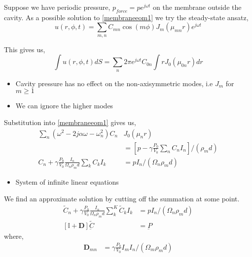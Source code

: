 \documentclass{beamer}
\begin{document}
\begin{frame}
 Suppose we have periodic pressure, $p_{force}=pe^{j\omega t}$ on the membrane outside the cavity.
 As a possible solution to \eqref{membraneeom1} we try the steady-state ansatz,
\begin{equation}\label{membranegeneral1}
 u(r,\phi,t)=\sum_{m,n}C_{mn}\cos(m\phi)J_m(\mu_{mn}r)e^{j\omega t}
\end{equation}
\end{frame}

\begin{frame}
This gives us,
\begin{equation}
 \int u(r,\phi,t)dS=\sum_n 2\pi e^{j\omega t} C_{0n}\int rJ_0(\mu_{0n}r)dr
\end{equation}

 \begin{itemize}
  \item Cavity pressure has no effect on the non-axisymmetric modes, i.e $J_m$ for $m\geq 1$
  \item We can ignore the higher modes
 \end{itemize}

\end{frame}

\begin{frame}
 Substitution into \eqref{membraneeom1} gives us,
 \begin{align}
  \sum_{n}(\omega^2-2j\alpha\omega-\omega^2_{n})C_{n}&J_0(\mu_{n}r)\nonumber\\
  &=\left[p-\gamma\frac{P_0}{V_0}\sum_{n}C_{n} I_{n}\right]/(\rho_md)\\
  C_n+\gamma\frac{P_0}{V_0}\frac{I_n}{\Omega_n\rho_md}\sum_kC_kI_k&=pI_n/(\Omega_n\rho_md)
 \end{align}
 \begin{itemize}
  \item System of infinite linear equations
 \end{itemize}
\end{frame}

\begin{frame}
 We find an approximate solution by cutting off the summation at some point.
 \begin{align}
  \widetilde{C}_n+\gamma\frac{P_0}{V_0}\frac{I_n}{\Omega_n\rho_md}\sum^K_k\widetilde{C}_kI_k&=pI_n/(\Omega_n\rho_md)\\
  \left[\mathbb{I}+\mathbf{D}\right]\widetilde{\underbar{C}}&=\underbar{P}
 \end{align}
 where,
 \begin{align*}
  \mathbf{D}_{mn}&=\gamma\frac{P_0}{V_0}I_mI_n/(\Omega_m\rho_md)
 \end{align*}


\end{frame}
\end{document}
